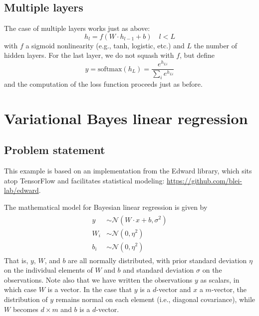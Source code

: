 \documentclass[10pt]{article}
\begin{document}
\subsection{Multiple layers}
The case of multiple layers works just as above:
\begin{equation}
    h_l = f(W \cdot h_{l-1} + b) \quad l < L
\end{equation}
with $f$ a sigmoid nonlinearity (e.g., tanh, logistic, etc.) and $L$ the number of hidden layers. For the last layer, we do not squash with $f$, but define
\begin{equation}
    y = \mathrm{softmax}(h_L) = \frac{e^{h_{Li}}}{\sum_i e^{h_{Li}}}
\end{equation}
and the computation of the loss function proceeds just as before.

\section{Variational Bayes linear regression}
\subsection{Problem statement}
This example is based on an implementation from the Edward library, which sits atop TensorFlow and facilitates statistical modeling: \url{https://github.com/blei-lab/edward}.

The mathematical model for Bayesian linear regression is given by
\begin{align}
    \label{pmodel}
    \begin{split}
        y &\sim \mathcal{N}(W \cdot x + b, \sigma^2) \\
        W_i &\sim \mathcal{N}(0, \eta^2) \\
        b_i &\sim \mathcal{N}(0, \eta^2)
    \end{split}
\end{align}
That is, $y$, $W$, and $b$ are all normally distributed, with prior standard deviation $\eta$ on the individual elements of $W$ and $b$ and standard deviation $\sigma$ on the observations. Note also that we have written the observations $y$ as scalars, in which case $W$ is a vector. In the case that $y$ is a $d$-vector and $x$ a $m$-vector, the distribution of $y$ remains normal on each element (i.e., diagonal covariance), while $W$ becomes $d \times m$ and $b$ is a $d$-vector.
\end{document}
